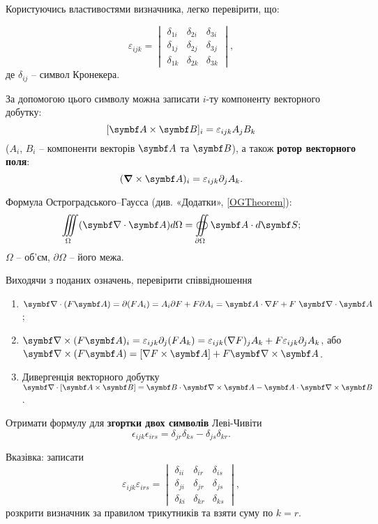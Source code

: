 \begin{Theory}
Користуючись властивостями визначника, легко перевірити, що:

\[
\varepsilon_{ijk} =
\begin{vmatrix}
\delta_{1i} & \delta_{2i} & \delta_{3i} \\
\delta_{1j} & \delta_{2j} & \delta_{3j} \\
\delta_{1k} & \delta_{2k} & \delta_{3k}
\end{vmatrix},
\]
де $\delta_{ij}$ -- символ Кронекера.

За допомогою цього символу можна записати $i$-ту компоненту векторного добутку:
\[
[ \vect{A} \times  \vect{B}]_i = \epsilon_{ijk} A_j B_k
\]
($A_i$, $B_i$ -- компоненти векторів $ \vect{A}$ та $ \vect{B}$), а також \textbf{ротор векторного поля}:
\[
(\boldsymbol{\nabla} \times \vect{A})_i = \varepsilon_{ijk} \partial_j A_k.
\]

Формула Остроградського--Гаусса (див. «Додатки», \eqref{OGTheorem}):
\begin{equation}\label{eq:OGF}
    \iiint\limits_\Omega (\vect{\nabla} \cdot \vect{A})  d\Omega = \oiint\limits_{\partial \Omega}  \vect{A} \cdot d \vect{S};
\end{equation}
$\Omega$ -- об'єм, $\partial \Omega$ -- його межа.
\end{Theory}


\begin{problem}%
Виходячи з поданих означень, перевірити співвідношення
	\begin{enumerate}[label=\alph*)]
		\item $\divg (F\vect{A}) = \partial (FA_i) = A_i \partial F + F \partial A_i = \vect{A} \cdot \nabla F + F\ \divg \vect{A}$;
		\item $\rot(F\vect{A})_i = \varepsilon_{ijk} \partial_j (FA_k) = \varepsilon_{ijk} (\nabla F)_j A_k + F \varepsilon_{ijk} \partial_j A_k$, або $\rot(F\vect{A}) = [\nabla F \times \vect{A}] + F \rot\vect{A}$.
        \item Дивергенція векторного добутку $\divg[\vect{A} \times \vect{B}] = \vect{B} \cdot \rot \vect{A} - \vect{A} \cdot \rot\vect{B}$.
	\end{enumerate}
\end{problem}

\begin{problem}%
Отримати формулу для \textbf{згортки двох символів} Леві-Чивіти
\begin{equation}\label{eq:LCh}
\epsilon_{ijk}\epsilon_{irs} = \delta_{jr}\delta_{ks} - \delta_{js}\delta_{kr}.
\end{equation}

Вказівка: записати
\[
\varepsilon_{ijk}\varepsilon_{irs} =
\begin{vmatrix}
\delta_{ii} & \delta_{ir} & \delta_{is} \\
\delta_{ji} & \delta_{jr} & \delta_{js} \\
\delta_{ki} & \delta_{kr} & \delta_{ks}
\end{vmatrix},
\]
розкрити визначник за правилом трикутників та взяти суму по $k=r$.
\end{problem}


